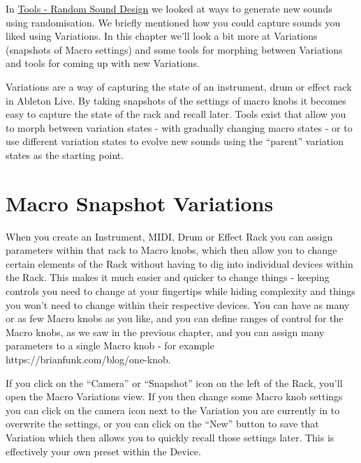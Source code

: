 \documentclass[
  12pt,
  letterpaper,
  oneside,
  open=any]{scrbook}
\begin{document}
In \hyperref[Chapter-024-Tool-Random_Sound_Design]{Tools - Random Sound
Design} we looked at ways to generate new sounds using randomisation. We
briefly mentioned how you could capture sounds you liked using
Variations. In this chapter we'll look a bit more at Variations
(snapshots of Macro settings) and some tools for morphing between
Variations and tools for coming up with new Variations.

\begin{tcolorbox}[enhanced jigsaw, colback=white, rightrule=.15mm, toprule=.15mm, arc=.35mm, opacitybacktitle=0.6, coltitle=black, leftrule=.75mm, bottomtitle=1mm, toptitle=1mm, left=2mm, bottomrule=.15mm, titlerule=0mm, colbacktitle=quarto-callout-tip-color!10!white, colframe=quarto-callout-tip-color-frame, title=\textcolor{quarto-callout-tip-color}{\faLightbulb}\hspace{0.5em}{Key idea}, breakable, opacityback=0]

Variations are a way of capturing the state of an instrument, drum or
effect rack in Ableton Live. By taking snapshots of the settings of
macro knobs it becomes easy to capture the state of the rack and recall
later. Tools exist that allow you to morph between variation states -
with gradually changing macro states - or to use different variation
states to evolve new sounds using the ``parent'' variation states as the
starting point.

\end{tcolorbox}

\section{Macro Snapshot Variations}\label{macro-snapshot-variations}

When you create an Instrument, MIDI, Drum or Effect Rack you can assign
parameters within that rack to Macro knobs, which then allow you to
change certain elements of the Rack without having to dig into
individual devices within the Rack. This makes it much easier and
quicker to change things - keeping controls you need to change at your
fingertips while hiding complexity and things you won't need to change
within their respective devices. You can have as many or as few Macro
knobs as you like, and you can define ranges of control for the Macro
knobs, as we saw in the previous chapter, and you can assign many
parameters to a single Macro knob - for example
https://brianfunk.com/blog/one-knob.

If you click on the ``Camera'' or ``Snapshot'' icon on the left of the
Rack, you'll open the Macro Variations view. If you then change some
Macro knob settings you can click on the camera icon next to the
Variation you are currently in to overwrite the settings, or you can
click on the ``New'' button to save that Variation which then allows you
to quickly recall those settings later. This is effectively your own
preset within the Device.
\end{document}
